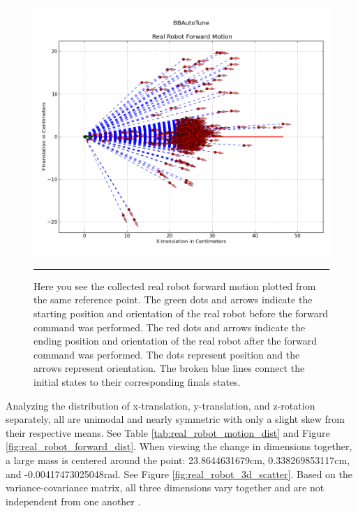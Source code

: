 \begin{figure}[htbp]
\centering
\includegraphics[scale=0.6]{../Figures/Chapter4/real_robot_forward_motion.png}
\rule{35em}{0.5pt}
\caption[Real Robot Forward Motion]{Here you see the collected real robot forward motion plotted from the same reference point. The green dots and arrows indicate the starting position and orientation of the real robot before the forward command was performed. The red dots and arrows indicate the ending position and orientation of the real robot after the forward command was performed. The dots represent position and the arrows represent orientation. The broken blue lines connect the initial states to their corresponding finals states.}
\label{fig:real_robot_forward_motion}
\end{figure}

Analyzing the distribution of x-translation, y-translation, and z-rotation separately, all are unimodal and nearly symmetric with only a slight skew from their respective means. See Table \ref{tab:real_robot_motion_dist} and Figure \ref{fig:real_robot_forward_dist}. When viewing the change in dimensions together, a large mass is centered around the point: 23.8644631679cm, 0.338269853117cm, and -0.00417473025048rad. See Figure \ref{fig:real_robot_3d_scatter}. Based on the variance-covariance matrix, all three dimensions vary together and are not independent from one another . 

